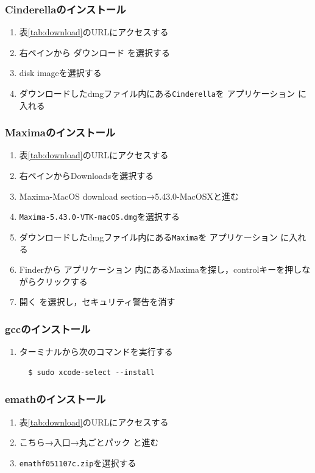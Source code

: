 \subsubsection{Cinderellaのインストール}
\begin{enumerate}
    \item 表\ref{tab:download}のURLにアクセスする
    \item 右ペインから ダウンロード を選択する
    \item disk imageを選択する
    \item ダウンロードしたdmgファイル内にある\verb|Cinderella|を アプリケーション に入れる
\end{enumerate}

\subsubsection{Maximaのインストール}
\begin{enumerate}
    \item 表\ref{tab:download}のURLにアクセスする
    \item 右ペインからDownloadsを選択する
    \item Maxima-MacOS download section→5.43.0-MacOSXと進む
    \item \verb|Maxima-5.43.0-VTK-macOS.dmg|を選択する
    \item ダウンロードしたdmgファイル内にある\verb|Maxima|を アプリケーション に入れる
    \item Finderから アプリケーション 内にあるMaximaを探し，controlキーを押しながらクリックする
    \item 開く を選択し，セキュリティ警告を消す
\end{enumerate}

\subsubsection{gccのインストール}
\begin{enumerate}
    \item ターミナルから次のコマンドを実行する
          \begin{lstlisting}
  $ sudo xcode-select --install
          \end{lstlisting}
\end{enumerate}

\subsubsection{emathのインストール}
\begin{enumerate}
    \item 表\ref{tab:download}のURLにアクセスする
    \item こちら→入口→丸ごとパック と進む
    \item \verb|emathf051107c.zip|を選択する
\end{enumerate}

